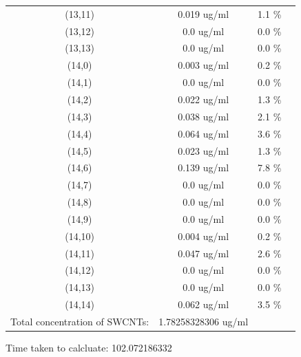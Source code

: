 \documentclass{article}
\begin{document}
\begin{tabular}{c c c c}
(13,11)&        0.019 ug/ml        &1.1 \%\\
(13,12)&        0.0 ug/ml        &0.0 \%\\
(13,13)&        0.0 ug/ml        &0.0 \%\\
(14,0)&        0.003 ug/ml        &0.2 \%\\
(14,1)&        0.0 ug/ml        &0.0 \%\\
(14,2)&        0.022 ug/ml        &1.3 \%\\
(14,3)&        0.038 ug/ml        &2.1 \%\\
(14,4)&        0.064 ug/ml        &3.6 \%\\
(14,5)&        0.023 ug/ml        &1.3 \%\\
(14,6)&        0.139 ug/ml        &7.8 \%\\
(14,7)&        0.0 ug/ml        &0.0 \%\\
(14,8)&        0.0 ug/ml        &0.0 \%\\
(14,9)&        0.0 ug/ml        &0.0 \%\\
(14,10)&        0.004 ug/ml        &0.2 \%\\
(14,11)&        0.047 ug/ml        &2.6 \%\\
(14,12)&        0.0 ug/ml        &0.0 \%\\
(14,13)&        0.0 ug/ml        &0.0 \%\\
(14,14)&        0.062 ug/ml        &3.5 \%\\
Total concentration of SWCNTs: &1.78258328306 ug/ml\\

\end{tabular}Time taken to calcluate: 102.072186332
\end{document}
